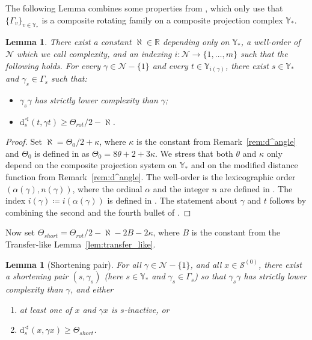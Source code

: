 \documentclass[svgnames]{amsart}
\theoremstyle{plain}
\newtheorem{lemma}[thm]{Lemma}
\theoremstyle{definition}
\newcommand{\dist}{\mathrm{d}}
\newcommand{\N}{\mathcal{N}}
\newcommand{\calS}{\mathcal{S}}
\renewcommand{\angle}{\sphericalangle}
\begin{document}
The following Lemma combines some properties from \cite[Section 3]{dfdt}, which only use that $ \{\Gamma_v\}_{v\in\mathbb{Y}_*}$ is a composite rotating family on a composite projection complex $\mathbb{Y}_*$.
\begin{lemma}\label{lem:reduction_for_original_rotating_fam}
    There exist a constant $\aleph\in\mathbb{R}$ depending only on $\mathbb{Y}_*$, a well-order of $\N$ which we call \emph{complexity}, and an indexing $i\colon \N\to\{1,\ldots, m\}$ such that the following holds. For every $\gamma\in \N-\{1\}$ and every $t\in \mathbb{Y}_{i(\gamma)}$, there exist $s \in \mathbb{Y}_*$ and $\gamma_s\in\Gamma_s$ such that:
    \begin{itemize}
        \item $\gamma_s\gamma$ has strictly lower complexity than $\gamma$;
        \item $\dist^\angle_s(t, \gamma t)\ge \Theta_{rot}/2-\aleph$.
    \end{itemize}
\end{lemma}

\begin{proof}
    Set $\aleph=\Theta_0/2 + \kappa$, where $\kappa$ is the constant from Remark~\ref{rem:d^angle} and $\Theta_0$ is defined in \cite[Remark 1.2 and Standing assumption 1.4]{dfdt} as
    $\Theta_0=8\theta+2+3\kappa.$
    We stress that both $\theta$ and $\kappa$ only depend on the composite projection system on $\mathbb{Y}_*$ and on the modified distance function from Remark~\ref{rem:d^angle}.
    The well-order is the lexicographic order $(\alpha(\gamma), n(\gamma))$, where the ordinal $\alpha$ and the integer $n$ are defined in \cite[Theorem 3.1 and Definitions 3.2 and 3.3]{dfdt}. The index $i(\gamma)\coloneq  i(\alpha(\gamma))$ is defined in \cite[Theorem 3.1]{dfdt}. The statement about $\gamma$ and $t$ follows by combining the second and the fourth bullet of \cite[Theorem 3.5]{dfdt}.
\end{proof}

Now set $\Theta_{short} =\Theta_{rot}/2-\aleph-2B-2\kappa$, where $B$ is the constant from the Transfer-like Lemma~\ref{lem:transfer_like}.

\begin{lemma}[Shortening pair]\label{lem:short_less_complex}
For all $\gamma\in \N-\{1\}$, and all $x\in \calS^{(0)}$, there exist a \emph{shortening pair} $(s,\gamma_s)$ (here $s\in\mathbb{Y}_*$ and $\gamma_s\in\Gamma_s$)  so that  $\gamma_s\gamma$ has strictly lower complexity than $\gamma$, and either
\begin{enumerate}
	 \item at least one of $x$ and $\gamma x$ is $s$-inactive, or
	 \item $\dist^\angle_s(x,\gamma x)\ge \Theta_{short}$.	
\end{enumerate}
\end{lemma}
\end{document}
